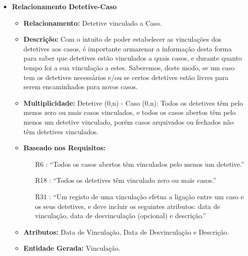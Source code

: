 \documentclass[a4paper,12pt]{scrreprt}
\begin{document}
        \begin{itemize}
        \item\textbf{Relacionamento Detetive-Caso}
        \begin{itemize}
            \item\textbf{Relacionamento:} Detetive vinculado a Caso.
            \item\textbf{Descrição:} Com o intuito de poder estabelecer as vinculações dos detetives aos casos, é importante armazenar a informação desta forma para saber que detetives estão vinculados a quais casos, e durante quanto tempo foi a sua vinculação a estes. Saberemos, deste modo, se um caso tem os detetives necessários e/ou se certos detetives estão livres para serem encaminhados para novos casos.
            \item\textbf{Multiplicidade:} Detetive (0,n) - Caso (0,n): Todos os detetives têm pelo menos zero ou mais casos vinculados, e todos os casos abertos têm pelo menos um detetive vinculado, porém casos arquivados ou fechados não têm detetives vinculados.
            \item\textbf{Baseado nos Requisitos:}
            \begin{itemize}
                \item [R6]: “Todos os casos abertos têm vinculados pelo menos um detetive.”
                \item [R18]: “Todos os detetives têm vinculado zero ou mais casos.”
                \item [R31]: “Um registo de uma vinculação efetua a ligação entre um caso e os seus detetives, e deve incluir os seguintes atributos: data de vinculação, data de desvinculação (opcional) e descrição.”
            \end{itemize}
            \item\textbf{Atributos:} Data de Vinculação, Data de Desvinculação e Descrição.
            \item\textbf{Entidade Gerada:} Vinculação.
        \end{itemize}
        
        \clearpage


\end{itemize}
\end{document}
